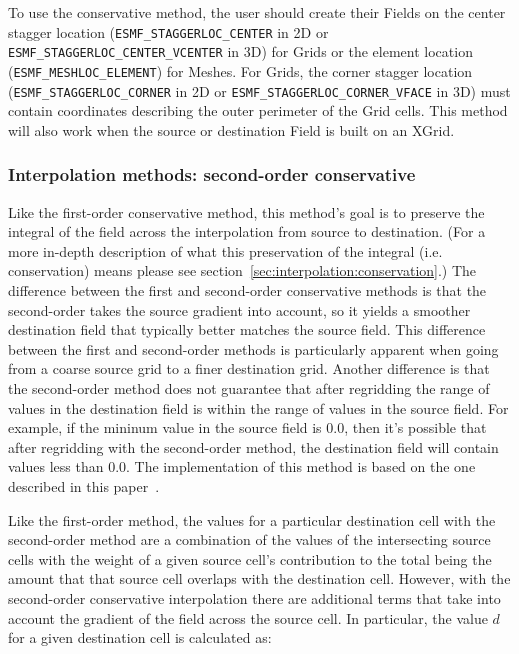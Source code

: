 \smallskip

 To use the conservative method, the user should create their Fields on the center 
 stagger location ({\tt ESMF\_STAGGERLOC\_CENTER} in 2D or {\tt ESMF\_STAGGERLOC\_CENTER\_VCENTER} in 3D) for Grids  or the element location ({\tt ESMF\_MESHLOC\_ELEMENT}) for Meshes.
 For Grids, the corner stagger location ({\tt ESMF\_STAGGERLOC\_CORNER} in 2D or {\tt ESMF\_STAGGERLOC\_CORNER\_VFACE} in 3D) must contain coordinates describing the outer perimeter of the Grid cells. This method will also work when the source or destination Field is built on an XGrid.

\subsubsection{Interpolation methods: second-order conservative}\label{sec:interpolation:conserve_2ndorder}
 Like the first-order conservative method, this method's goal is to preserve the integral of the field across the interpolation from source to destination.  
 (For a more in-depth description of what this preservation of the integral (i.e. conservation) means please see section~\ref{sec:interpolation:conservation}.)  The difference between the first and second-order conservative methods is that the second-order takes the source gradient into account, so
 it yields a smoother destination field that typically better matches the source field. This difference between the first and second-order methods 
 is particularly apparent when going from a coarse source grid to a finer destination grid. Another difference is that the second-order method
  does not guarantee that after regridding the range of values in the destination field is within the range of 
 values in the source field. For example, if the mininum value in the source field is 0.0, then it's possible that after regridding with the 
 second-order method, the destination field will contain values less than 0.0.  The implementation of this method is based on the one 
  described in this paper~\cite{ConservativeOrder2}. 


 Like the first-order method, the values for a particular destination cell with the second-order method
 are a combination of the values of the intersecting source cells with the weight of a given source cell's contribution to the total 
 being the amount that that source cell overlaps with the destination cell. 
 However, with the second-order conservative interpolation there are additional terms that take into account the gradient of the field 
 across the source cell. In particular, the value $d$ for a given destination cell is calculated as:
 
